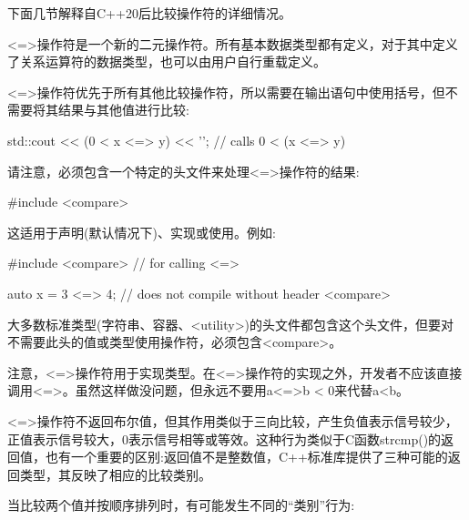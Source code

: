 下面几节解释自C++20后比较操作符的详细情况。


<=>操作符是一个新的二元操作符。所有基本数据类型都有定义，对于其中定义了关系运算符的数据类型，也可以由用户自行重载定义。

<=>操作符优先于所有其他比较操作符，所以需要在输出语句中使用括号，但不需要将其结果与其他值进行比较:

\begin{cpp}
std::cout << (0 < x <=> y) << '\n'; // calls 0 < (x <=> y)
\end{cpp}

请注意，必须包含一个特定的头文件来处理<=>操作符的结果:

\begin{cpp}
#include <compare>
\end{cpp}

这适用于声明(默认情况下)、实现或使用。例如:

\begin{cpp}
#include <compare> // for calling <=>

auto x = 3 <=> 4; // does not compile without header <compare>
\end{cpp}

大多数标准类型(字符串、容器、<utility>)的头文件都包含这个头文件，但要对不需要此头的值或类型使用操作符，必须包含<compare>。

注意，<=>操作符用于实现类型。在<=>操作符的实现之外，开发者不应该直接调用<=>。虽然这样做没问题，但永远不要用a<=>b < 0来代替a<b。


<=>操作符不返回布尔值，但其作用类似于三向比较，产生负值表示信号较少，正值表示信号较大，0表示信号相等或等效。这种行为类似于C函数strcmp()的返回值，也有一个重要的区别:返回值不是整数值，C++标准库提供了三种可能的返回类型，其反映了相应的比较类别。


当比较两个值并按顺序排列时，有可能发生不同的“类别”行为:

